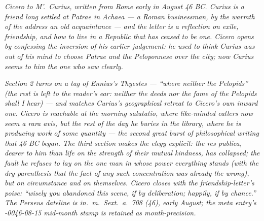 
\textit{Cicero to M'.\ Curius, written from Rome early in August 46
BC. Curius is a friend long settled at Patrae in Achaea --- a Roman
businessman, by the warmth of the address an old acquaintance ---
and the letter is a reflection on exile, friendship, and how to
live in a Republic that has ceased to be one. Cicero opens by
confessing the inversion of his earlier judgement: he used to think
Curius was out of his mind to choose Patrae and the Peloponnese over
the city; now Curius seems to him the one who saw clearly.}

\textit{Section 2 turns on a tag of Ennius's \textit{Thyestes} ---
``where neither the Pelopids'' (the rest is left to the reader's ear:
\textit{neither the deeds nor the fame of the Pelopids shall I
hear}) --- and matches Curius's geographical retreat to Cicero's own
inward one. Cicero is reachable at the morning \textit{salutatio},
where like-minded callers now seem a \textit{rara avis}, but the rest
of the day he buries in the library, where he is producing work of
some quantity --- the second great burst of philosophical writing
that 46 BC began. The third section makes the elegy explicit: the
\textit{res publica}, dearer to him than life on the strength of
their mutual kindness, has collapsed; the fault he refuses to lay
on the one man in whose power everything stands (with the dry
parenthesis that the fact of any such concentration was already
the wrong), but on circumstance and on themselves. Cicero closes
with the friendship-letter's poise: ``wisely you abandoned this
scene, if by deliberation; happily, if by chance.'' The Perseus
dateline is \textit{in.\ m.\ Sext.\ a.\ 708 (46)}, early August;
the meta entry's \textit{-0046-08-15} mid-month stamp is retained
as month-precision.}
